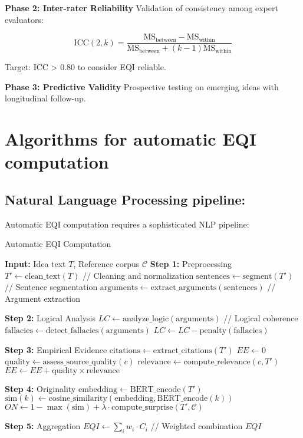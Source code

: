 \textbf{Phase 2: Inter-rater Reliability}
Validation of consistency among expert evaluators:

\begin{equation}
	\text{ICC}(2,k) = \frac{\text{MS}_\text{between} - \text{MS}_\text{within}}{\text{MS}_\text{between} + (k-1)\text{MS}_\text{within}}
	\label{eq:icc}
\end{equation}

Target: ICC > 0.80 to consider EQI reliable.

\textbf{Phase 3: Predictive Validity}
Prospective testing on emerging ideas with longitudinal follow-up.

\newpage
\section{Algorithms for automatic EQI computation}
\subsection*{Natural Language Processing pipeline:}

Automatic EQI computation requires a sophisticated NLP pipeline:

\begin{algorithm}[H]
	\caption{Automatic EQI Computation}
	\label{alg:eqi-computation}
	\begin{algorithmic}[1]
		\State \textbf{Input:} Idea text $T$, Reference corpus $\mathcal{C}$
		\State \textbf{Step 1:} Preprocessing
		\State $T' \leftarrow \text{clean\_text}(T)$ // Cleaning and normalization
		\State $\text{sentences} \leftarrow \text{segment}(T')$ // Sentence segmentation
		\State $\text{arguments} \leftarrow \text{extract\_arguments}(\text{sentences})$ // Argument extraction
		
		\State \textbf{Step 2:} Logical Analysis
		\State $LC \leftarrow \text{analyze\_logic}(\text{arguments})$ // Logical coherence
		\State $\text{fallacies} \leftarrow \text{detect\_fallacies}(\text{arguments})$
		\State $LC \leftarrow LC - \text{penalty}(\text{fallacies})$
		
		\State \textbf{Step 3:} Empirical Evidence  
		\State $\text{citations} \leftarrow \text{extract\_citations}(T')$
		\State $EE \leftarrow 0$
		\State $\text{quality} \leftarrow \text{assess\_source\_quality}(c)$
		\State $\text{relevance} \leftarrow \text{compute\_relevance}(c, T')$
		\State $EE \leftarrow EE + \text{quality} \times \text{relevance}$
		\EndFor
		
		\State \textbf{Step 4:} Originality
		\State $\text{embedding} \leftarrow \text{BERT\_encode}(T')$
		\State $\text{sim}(k) \leftarrow \text{cosine\_similarity}(\text{embedding}, \text{BERT\_encode}(k))$
		\EndFor
		\State $ON \leftarrow 1 - \max(\text{sim}) + \lambda \cdot \text{compute\_surprise}(T', \mathcal{C})$
		
		\State \textbf{Step 5:} Aggregation
		\State $EQI \leftarrow \sum_{i} w_i \cdot C_i$ // Weighted combination
		\Return $EQI$
	\end{algorithmic}
\end{algorithm}

